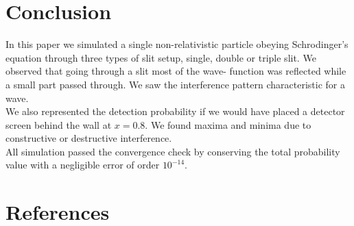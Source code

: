 \documentclass[english,notitlepage,reprint,nofootinbib]{revtex4-2}  %
\begin{document}
	
	
	\section{Conclusion}\label{sec:conclusion}
	
	In this paper we simulated a single non-relativistic particle obeying 
	Schrodinger's equation through three types of slit setup, single, double
	or triple slit. We observed that going through a slit most of the wave-
	function was reflected while a small part passed through. We saw the 
	interference pattern characteristic for a wave. \\
	
	We also represented the detection probability if we would have placed 
	a detector screen behind the wall at $x=0.8$. We found maxima and 
	minima due to constructive or destructive interference. \\
	
	All simulation passed the convergence check by conserving the total 
	probability value with a negligible error of order  $10^{-14}$. \\
	
	
	
	\onecolumngrid
	\section*{References}
	
	
	
\end{document}
